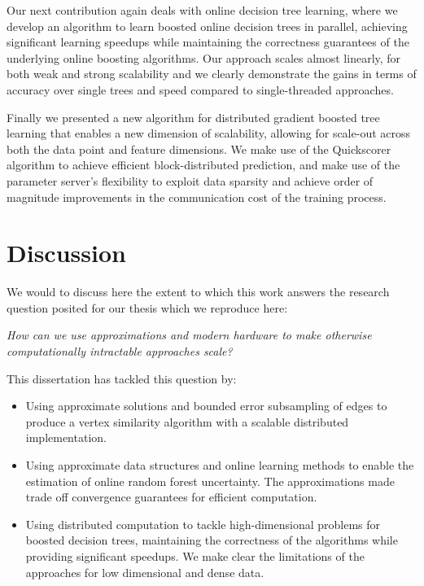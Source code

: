 Our next contribution again deals with online decision tree learning, where we develop an algorithm
to learn boosted online decision trees in parallel, achieving significant
learning speedups while maintaining the correctness guarantees of the
underlying online boosting algorithms. Our approach scales almost linearly,
for both weak and strong scalability and we clearly demonstrate the gains
in terms of accuracy over single trees and speed compared to single-threaded
approaches.


Finally we presented a new algorithm for distributed gradient boosted tree
learning that enables a new dimension of scalability, allowing for scale-out
across both the data point and feature dimensions. We make use of the Quickscorer
algorithm to achieve efficient block-distributed prediction, and make use
of the parameter server's flexibility to exploit data sparsity and achieve
order of magnitude improvements in the communication cost of the training process.

\section{Discussion}

We would to discuss here the extent to which this work answers the research
question posited for our thesis which we reproduce here:

\begin{displayquote}
	\emph{How can we use approximations and modern hardware to make otherwise computationally intractable approaches scale?}
\end{displayquote}

\noindent
This dissertation has tackled this question by:
\begin{itemize}
	\item Using approximate solutions and bounded error subsampling of edges
	to produce a vertex similarity algorithm with a scalable
	distributed implementation.

	\item Using approximate data structures and online learning methods
	to enable the estimation of online random forest uncertainty. The approximations
	made trade off convergence guarantees for efficient computation.

	\item Using distributed computation to tackle high-dimensional problems
	for boosted decision trees, maintaining the correctness of the algorithms
	while providing significant speedups. We make clear the limitations
	of the approaches for low dimensional and dense data.
\end{itemize}


